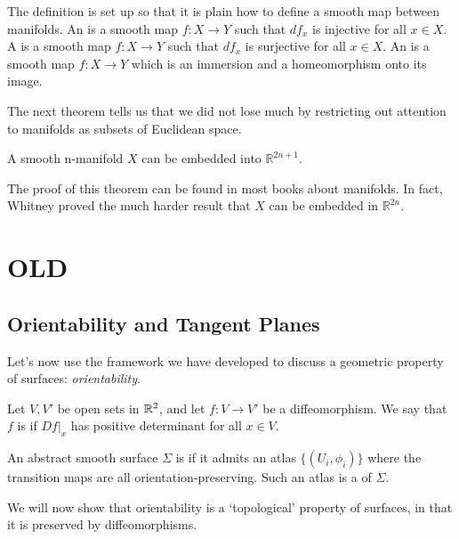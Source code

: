 \documentclass[a4paper, 10pt, twocolumn]{amsart}
\begin{document}
The definition is set up so that it is plain how to define a smooth map between manifolds. An  is a smooth map $f: X \rightarrow Y$ such that $d f_{x}$ is injective for all $x \in X$. A  is a smooth map $f: X \rightarrow Y$ such that $d f_{x}$ is surjective for all $x \in X$. An  is a smooth map $f: X \rightarrow Y$ which is an immersion and a homeomorphism onto its image.

The next theorem tells us that we did not lose much by restricting out attention to manifolds as subsets of Euclidean space.

\begin{theorem}
    A smooth n-manifold $X$ can be embedded into $\mathbb{R}^{2 n+1}$.
\end{theorem}

The proof of this theorem can be found in most books about manifolds. In fact, Whitney proved the much harder result that $X$ can be embedded in $\mathbb{R}^{2 n}$.
\section{OLD}

\subsection{Orientability and Tangent Planes}

Let's now use the framework we have developed to discuss a geometric property of surfaces: \emph{orientability}.

\begin{definition}
    Let $V, V'$ be open sets in $\mathbb{R}^2$, and let $f: V \rightarrow V'$ be a diffeomorphism. We say that $f$ is  if $\left. Df\right|_x$ has positive determinant for all $x \in V$.
\end{definition}

\begin{definition}[Orientability]
An abstract smooth surface $\Sigma$ is  if it admits an atlas $\{(U_i, \phi_i)\}$ where the transition maps are all orientation-preserving. Such an atlas is a  of $\Sigma$.
\end{definition}

We will now show that orientability is a `topological' property of surfaces, in that it is preserved by diffeomorphisms.
\end{document}
